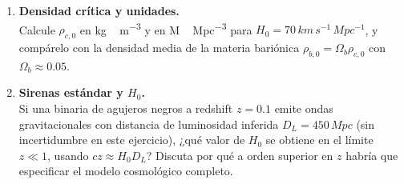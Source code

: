 \begin{enumerate}[leftmargin=2.2em, label=\textbf{P\arabic*.}]
\item \textbf{Densidad crítica y unidades.} \\
Calcule $\rho_{c,0}$ en \si{kg\,m^{-3}} y en \si{M_\odot\,Mpc^{-3}} para $H_0=70\,\si{km\,s^{-1}\,Mpc^{-1}}$, y compárelo con la densidad media de la materia bariónica $\rho_{b,0}=\Omega_b\rho_{c,0}$ con $\Omega_b\approx0.05$.

\item \textbf{Sirenas estándar y $H_0$.} \\
Si una binaria de agujeros negros a redshift $z=0.1$ emite ondas gravitacionales con distancia de luminosidad inferida $D_L=450\,\si{Mpc}$ (sin incertidumbre en este ejercicio), ¿qué valor de $H_0$ se obtiene en el límite $z\ll1$, usando $cz\approx H_0 D_L$? Discuta por qué a orden superior en $z$ habría que especificar el modelo cosmológico completo.

\end{enumerate}
